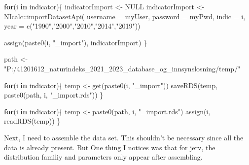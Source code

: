 \documentclass[
]{book}
\newenvironment{Shaded}{\begin{snugshade}}{\end{snugshade}}
\newcommand{\AttributeTok}[1]{\textcolor[rgb]{0.77,0.63,0.00}{#1}}
\newcommand{\ConstantTok}[1]{\textcolor[rgb]{0.00,0.00,0.00}{#1}}
\newcommand{\ControlFlowTok}[1]{\textcolor[rgb]{0.13,0.29,0.53}{\textbf{#1}}}
\newcommand{\FunctionTok}[1]{\textcolor[rgb]{0.00,0.00,0.00}{#1}}
\newcommand{\NormalTok}[1]{#1}
\newcommand{\OtherTok}[1]{\textcolor[rgb]{0.56,0.35,0.01}{#1}}
\newcommand{\SpecialCharTok}[1]{\textcolor[rgb]{0.00,0.00,0.00}{#1}}
\newcommand{\StringTok}[1]{\textcolor[rgb]{0.31,0.60,0.02}{#1}}
\begin{document}
\begin{Shaded}
\begin{Highlighting}[]
\ControlFlowTok{for}\NormalTok{(i }\ControlFlowTok{in}\NormalTok{ indicator)\{}
\NormalTok{indicatorImport }\OtherTok{\textless{}{-}} \ConstantTok{NULL}
\NormalTok{indicatorImport }\OtherTok{\textless{}{-}}\NormalTok{ NIcalc}\SpecialCharTok{::}\FunctionTok{importDatasetApi}\NormalTok{(}
  \AttributeTok{username =}\NormalTok{ myUser,}
  \AttributeTok{password =}\NormalTok{ myPwd,}
  \AttributeTok{indic =}\NormalTok{ i,}
  \AttributeTok{year =} \FunctionTok{c}\NormalTok{(}\StringTok{"1990"}\NormalTok{,}\StringTok{"2000"}\NormalTok{,}\StringTok{"2010"}\NormalTok{,}\StringTok{"2014"}\NormalTok{,}\StringTok{"2019"}\NormalTok{))}

\FunctionTok{assign}\NormalTok{(}\FunctionTok{paste0}\NormalTok{(i, }\StringTok{"\_import"}\NormalTok{), indicatorImport)}
\NormalTok{\}}
\end{Highlighting}
\end{Shaded}

\begin{Shaded}
\begin{Highlighting}[]
\NormalTok{path }\OtherTok{\textless{}{-}} \StringTok{"P:/41201612\_naturindeks\_2021\_2023\_database\_og\_innsynslosning/temp/"}

\ControlFlowTok{for}\NormalTok{(i }\ControlFlowTok{in}\NormalTok{ indicator)\{}
\NormalTok{  temp }\OtherTok{\textless{}{-}} \FunctionTok{get}\NormalTok{(}\FunctionTok{paste0}\NormalTok{(i, }\StringTok{"\_import"}\NormalTok{))}
  \FunctionTok{saveRDS}\NormalTok{(temp, }\FunctionTok{paste0}\NormalTok{(path, i, }\StringTok{"\_import.rds"}\NormalTok{))}
\NormalTok{\}}

\ControlFlowTok{for}\NormalTok{(i }\ControlFlowTok{in}\NormalTok{ indicator)\{}
\NormalTok{  temp }\OtherTok{\textless{}{-}} \FunctionTok{paste0}\NormalTok{(path, i, }\StringTok{"\_import.rds"}\NormalTok{)}
  \FunctionTok{assign}\NormalTok{(i, }\FunctionTok{readRDS}\NormalTok{(temp))}
\NormalTok{\}}
\end{Highlighting}
\end{Shaded}

Next, I need to assemble the data set. This shouldn't be necessary since all the data is already present. But One thing I notices was that for jerv, the distribution familiy and parameters only appear after assembling.
\end{document}
